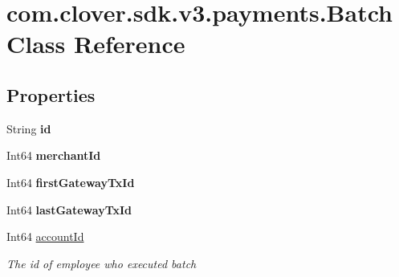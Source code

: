 \hypertarget{classcom_1_1clover_1_1sdk_1_1v3_1_1payments_1_1_batch}{}\section{com.\+clover.\+sdk.\+v3.\+payments.\+Batch Class Reference}
\label{classcom_1_1clover_1_1sdk_1_1v3_1_1payments_1_1_batch}
\subsection*{Properties}
\begin{DoxyCompactItemize}
\item 
\mbox{\label{classcom_1_1clover_1_1sdk_1_1v3_1_1payments_1_1_batch_abeda4625816060f41202fead89654513}} 
String {\bfseries id}
\item 
\mbox{\label{classcom_1_1clover_1_1sdk_1_1v3_1_1payments_1_1_batch_a46a770d203a42ff9283721d8744c6430}} 
Int64 {\bfseries merchant\+Id}
\item 
\mbox{\label{classcom_1_1clover_1_1sdk_1_1v3_1_1payments_1_1_batch_aca9e66b9936d2a0206c0cbf72885ab11}} 
Int64 {\bfseries first\+Gateway\+Tx\+Id}
\item 
\mbox{\label{classcom_1_1clover_1_1sdk_1_1v3_1_1payments_1_1_batch_a85dd236d4354d1fedc74b5af30d6a56f}} 
Int64 {\bfseries last\+Gateway\+Tx\+Id}
\item 
Int64 \hyperlink{classcom_1_1clover_1_1sdk_1_1v3_1_1payments_1_1_batch_a1b04e1c45cbaaf0f0018645c91f1d6db}{account\+Id}
\begin{DoxyCompactList}\small\item\em The id of employee who executed batch \end{DoxyCompactList}\item 

\end{DoxyCompactItemize}
